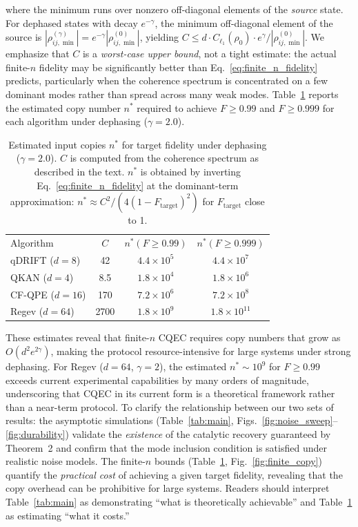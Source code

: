 \documentclass[prx,twocolumn,superscriptaddress,longbibliography,floatfix]{revtex4-2}
\begin{document}
where the minimum runs over nonzero off-diagonal elements of the \emph{source} state.
For dephased states with decay $e^{-\gamma}$, the minimum off-diagonal element of the source is $|\rho_{ij,\min}^{(\gamma)}| = e^{-\gamma}|\rho_{ij,\min}^{(0)}|$, yielding $C \leq d \cdot C_{\ell_1}(\rho_0) \cdot e^{\gamma} / |\rho_{ij,\min}^{(0)}|$.
We emphasize that $C$ is a \emph{worst-case upper bound}, not a tight estimate: the actual finite-$n$ fidelity may be significantly better than Eq.~\eqref{eq:finite_n_fidelity} predicts, particularly when the coherence spectrum is concentrated on a few dominant modes rather than spread across many weak modes.
Table~\ref{tab:finite_n} reports the estimated copy number $n^*$ required to achieve $F \geq 0.99$ and $F \geq 0.999$ for each algorithm under dephasing ($\gamma = 2.0$).

\begin{table}[H]
\caption{Estimated input copies $n^*$ for target fidelity under dephasing ($\gamma = 2.0$). $C$ is computed from the coherence spectrum as described in the text. $n^*$ is obtained by inverting Eq.~\eqref{eq:finite_n_fidelity} at the dominant-term approximation: $n^* \approx C^2 / (4(1-F_\mathrm{target})^2)$ for $F_\mathrm{target}$ close to 1.}
\label{tab:finite_n}
\begin{ruledtabular}
\begin{tabular}{lccc}
Algorithm & $C$ & $n^*(F\!\geq\!0.99)$ & $n^*(F\!\geq\!0.999)$ \\
\colrule
qDRIFT ($d=8$) & 42 & $4.4 \times 10^5$ & $4.4 \times 10^7$ \\
QKAN ($d=4$) & 8.5 & $1.8 \times 10^4$ & $1.8 \times 10^6$ \\
CF-QPE ($d=16$) & 170 & $7.2 \times 10^6$ & $7.2 \times 10^8$ \\
Regev ($d=64$) & 2700 & $1.8 \times 10^9$ & $1.8 \times 10^{11}$ \\
\end{tabular}
\end{ruledtabular}
\end{table}

These estimates reveal that finite-$n$ CQEC requires copy numbers that grow as $O(d^2 e^{2\gamma})$, making the protocol resource-intensive for large systems under strong dephasing.
For Regev ($d=64$, $\gamma=2$), the estimated $n^* \sim 10^9$ for $F \geq 0.99$ exceeds current experimental capabilities by many orders of magnitude, underscoring that CQEC in its current form is a theoretical framework rather than a near-term protocol.
To clarify the relationship between our two sets of results: the asymptotic simulations (Table~\ref{tab:main}, Figs.~\ref{fig:noise_sweep}--\ref{fig:durability}) validate the \emph{existence} of the catalytic recovery guaranteed by Theorem~2 and confirm that the mode inclusion condition is satisfied under realistic noise models.
The finite-$n$ bounds (Table~\ref{tab:finite_n}, Fig.~\ref{fig:finite_copy}) quantify the \emph{practical cost} of achieving a given target fidelity, revealing that the copy overhead can be prohibitive for large systems.
Readers should interpret Table~\ref{tab:main} as demonstrating ``what is theoretically achievable'' and Table~\ref{tab:finite_n} as estimating ``what it costs.''
\end{document}
